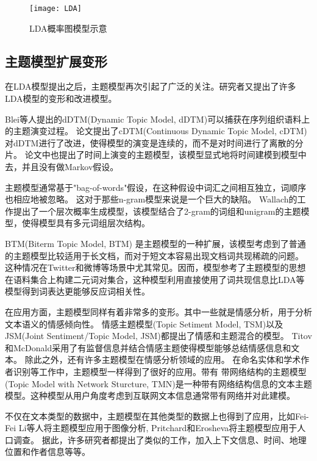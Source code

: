 \begin{figure}[htb]\centering
  \texttt{[image: LDA]}
  \caption{LDA概率图模型示意}
  \label{fig:LDA}%
\end{figure}

\subsection{主题模型扩展变形}
在LDA模型提出之后，主题模型再次引起了广泛的关注。研究者又提出了许多LDA模型的变形和改进模型。

Blei等人提出的dDTM(Dynamic Topic Model, dDTM)\cite{blei2006dynamic}可以捕获在序列组织语料上的主题演变过程。
论文\cite{wang2012continuous}提出了cDTM(Continuous Dynamic Topic Model, cDTM)对dDTM进行了改进，使得模型的演变是连续的，而不是对时间进行了离散的分片。
论文\cite{wang2006topics}中也提出了时间上演变的主题模型，该模型显式地将时间建模到模型中去，并且没有做Markov假设。

主题模型通常基于"bag-of-words"假设，在这种假设中词汇之间相互独立，词顺序也相应地被忽略。
这对于那些n-gram模型来说是一个巨大的缺陷。
Wallach的工作\cite{wallach2006topic}提出了一个层次概率生成模型，该模型结合了2-gram的词组和unigram的主题模型，使得模型具有多元词组层次结构。

BTM(Biterm Topic Model, BTM) \cite{yan2013biterm}是主题模型的一种扩展，该模型考虑到了普通的主题模型比较适用于长文档，而对于短文本容易出现文档词共现稀疏的问题。
这种情况在Twitter和微博等场景中尤其常见。因而，模型参考了主题模型的思想在语料集合上构建二元词对集合，这种模型利用直接使用了词共现信息比LDA等模型得到词表达更能够反应词相关性。

在应用方面，主题模型同样有着非常多的变形。其中一些就是情感分析，用于分析文本语义的情感倾向性。
情感主题模型(Topic Setiment Model, TSM)\cite{mei2007topic}以及JSM(Joint Sentiment/Topic Model, JSM)\cite{lin2009joint}都提出了情感和主题混合的模型。
Titov和McDonald\cite{titov2008modeling, titov2008joint}采用了有监督信息并结合情感主题使得模型能够总结情感信息和文本。
除此之外，还有许多主题模型在情感分析领域的应用\cite{lu2011multi, jo2011aspect, li2010sentiment, si2013exploiting}。
在命名实体\cite{han2012entity, newman2006statistical, shu2009latent, kim2012etm}和学术作者识别\cite{rosen2004author}等工作中，主题模型一样得到了很好的应用。带有
带网络结构的主题模型(Topic Model with Network Sturcture, TMN)\cite{mei2008topic}是一种带有网络结构信息的文本主题模型。这种模型从用户角度考虑到互联网文本信息通常带有网络并对此建模。

不仅在文本类型的数据中，主题模型在其他类型的数据上也得到了应用，比如Fei-Fei Li等人将主题模型应用于图像分析\cite{fei2005bayesian, sivic2005discovering}, 
Pritchard\cite{pritchard2000inference}和Erosheva\cite{erosheva2002grade}将主题模型应用于人口调查。
据此，许多研究者都提出了类似的工作，加入上下文信息\cite{mei2006mixture}、时间\cite{wang2006topics}、地理位置和作者信息等等。

